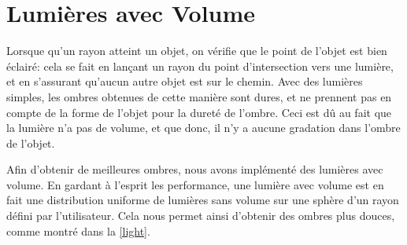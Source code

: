 \documentclass{article}
\begin{document}
\section{Lumières avec Volume}

Lorsque qu'un rayon atteint un objet, on vérifie que le point de l'objet est
bien éclairé: cela se fait en lançant un rayon du point d'intersection vers une
lumière, et en s'assurant qu'aucun autre objet est sur le chemin. Avec des
lumières simples, les ombres obtenues de cette manière sont dures, et ne
prennent pas en compte de la forme de l'objet pour la dureté de l'ombre.
Ceci est dû au fait que la lumière n'a pas de volume, et que donc, il n'y a
aucune gradation dans l'ombre de l'objet.

Afin d'obtenir de meilleures ombres, nous avons implémenté des lumières avec
volume. En gardant à l'esprit les performance, une lumière avec volume est en
fait une distribution uniforme de lumières sans volume sur une sphère d'un
rayon défini par l'utilisateur. Cela nous permet ainsi d'obtenir des ombres plus
douces, comme montré dans la \cref{light}.
\end{document}
